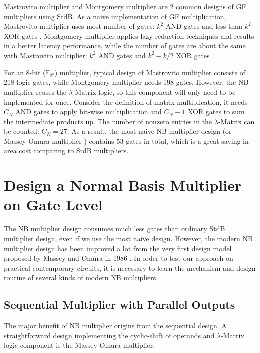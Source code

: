 
Mastrovito multiplier \cite{mastro:1989} and Montgomery multiplier \cite{PT:1985} are 2 common designs
of GF multipliers using StdB. As a naive implementation of GF multiplication,
Mastrovito multiplier uses most number of gates:
$k^2$ AND gates and less than $k^2$ XOR gates \cite{Mastrovito}. Montgomery multiplier 
applies lazy reduction techniques and results in a better latency performance, while the number of gates are about
the same with Mastrovito multiplier:
$k^2$ AND gates and $k^2-k/2$ XOR gates \cite{wu:2002}. 

For an 8-bit ($\mathbb F_{2^8}$) multiplier, typical design of Mastrovito multiplier consists of 218 logic gates, while 
Montgomery multiplier needs 198 gates. However, the NB multiplier reuses the $\lambda$-Matrix 
logic, so this component will only need to be implemented for once. 
Consider the definition of matrix multiplication, it needs $C_N$ AND gates to apply 
bit-wise multiplication and $C_N-1$ XOR gates to sum the intermediate products up. The number of nonzero entries
in the $\lambda$-Matrix can be counted: $C_N = 27$.
As a result, the most naive NB multiplier design (or Massey-Omura multiplier \cite{MasseyOmura})
contains 53 gates in total, which is a great saving in area cost comparing to StdB multipliers.

\section{Design a Normal Basis Multiplier on Gate Level}
\label{sec:nbdesign}
The NB multiplier design consumes much less gates than ordinary StdB multiplier design, even if 
we use the most naive design. However, the modern NB multiplier design has been improved a lot from the 
very first design model proposed by Massey and Omura in 1986 \cite{MasseyOmura}. In order to 
test our approach on practical contemporary circuits, it is necessary to learn the mechanism and design 
routine of several kinds of modern NB multipliers.
\subsection{Sequential Multiplier with Parallel Outputs}
The major benefit of NB multiplier origins from the sequential design. A straightforward design implementing 
the cyclic-shift of operands and $\lambda$-Matrix logic component is the Massey-Omura multiplier.

